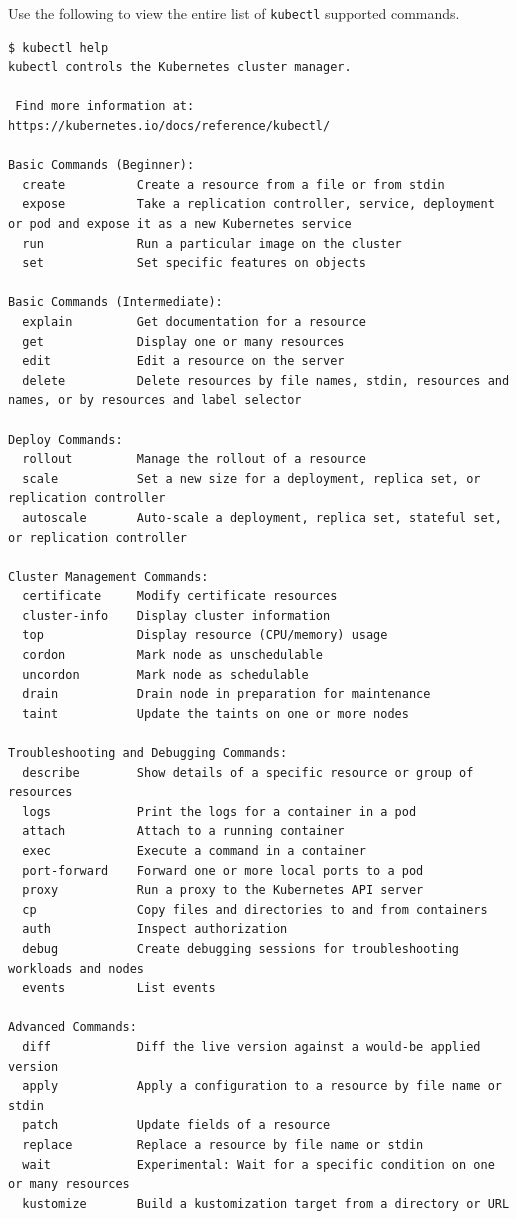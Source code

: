 Use the following to view the entire list of \verb|kubectl| supported commands.
\begin{lstlisting}
$ kubectl help
kubectl controls the Kubernetes cluster manager.

 Find more information at: https://kubernetes.io/docs/reference/kubectl/

Basic Commands (Beginner):
  create          Create a resource from a file or from stdin
  expose          Take a replication controller, service, deployment or pod and expose it as a new Kubernetes service
  run             Run a particular image on the cluster
  set             Set specific features on objects

Basic Commands (Intermediate):
  explain         Get documentation for a resource
  get             Display one or many resources
  edit            Edit a resource on the server
  delete          Delete resources by file names, stdin, resources and names, or by resources and label selector

Deploy Commands:
  rollout         Manage the rollout of a resource
  scale           Set a new size for a deployment, replica set, or replication controller
  autoscale       Auto-scale a deployment, replica set, stateful set, or replication controller

Cluster Management Commands:
  certificate     Modify certificate resources
  cluster-info    Display cluster information
  top             Display resource (CPU/memory) usage
  cordon          Mark node as unschedulable
  uncordon        Mark node as schedulable
  drain           Drain node in preparation for maintenance
  taint           Update the taints on one or more nodes

Troubleshooting and Debugging Commands:
  describe        Show details of a specific resource or group of resources
  logs            Print the logs for a container in a pod
  attach          Attach to a running container
  exec            Execute a command in a container
  port-forward    Forward one or more local ports to a pod
  proxy           Run a proxy to the Kubernetes API server
  cp              Copy files and directories to and from containers
  auth            Inspect authorization
  debug           Create debugging sessions for troubleshooting workloads and nodes
  events          List events

Advanced Commands:
  diff            Diff the live version against a would-be applied version
  apply           Apply a configuration to a resource by file name or stdin
  patch           Update fields of a resource
  replace         Replace a resource by file name or stdin
  wait            Experimental: Wait for a specific condition on one or many resources
  kustomize       Build a kustomization target from a directory or URL


\end{lstlisting}
